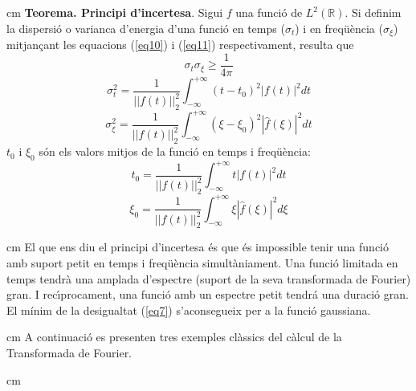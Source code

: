 \documentclass{article}
\def\R{\mathbb R}
\begin{document}
 cm
\noindent
\textbf{Teorema. Principi d'incertesa}.
Sigui $f$ una funci\'o de $L^2(\R)$.
Si definim la dispersi\'o o varian{c}a d'energia d'una funci\'o en temps 
($\sigma_t$) i en freq\"u\`encia ($\sigma_\xi$) mitjan\c{c}ant les equacions 
(\ref{eq10}) 
i (\ref{eq11}) respectivament, resulta que
\begin{equation}
\label{eq9}
\sigma_t \sigma_\xi \geq \frac{1}{4 \pi}
\end{equation}
\begin{equation}
\label{eq10}
\sigma^2_t=\frac{1}{||f(t)||^2_2}\int_{-\infty}^{+\infty} (t-t_0)^2 |f(t)|^2 dt
\end{equation}
\begin{equation}
\label{eq11}
\sigma^2_\xi=\frac{1}{||f(t)||^2_2}\int_{-\infty}^{+\infty} (\xi-\xi_0)^2 |\hat{f}(\xi)|^2 dt
\end{equation}
\noindent
$t_0$ i $\xi_0$ s\'on els valors mitjos de la funci\'o en temps i freq\"u\`encia:
\[
t_0=\frac{1}{||f(t)||^2_2}\int_{-\infty}^{+\infty} t |f(t)|^2 dt
\]
\[
\xi_0=\frac{1}{||f(t)||^2_2}\int_{-\infty}^{+\infty} \xi |\hat{f}(\xi)|^2 d\xi
\]

 cm
El que ens diu el principi d'incertesa \'es que \'es impossible tenir  
una funci\'o amb suport petit en temps i freq\"u\`encia simult\`aniament. 
Una funci\'o limitada en temps tendr\`a una amplada d'espectre (suport de la
seva transformada de Fourier) gran. I rec\'\i procament, una funci\'o amb un 
espectre petit tendr\'a una duraci\'o gran. El m\'inim de la desigualtat (\ref{eq7})
s'aconsegueix per a la funci\'o gaussiana.

 cm
A continuaci\'o es presenten tres exemples cl\`assics del c\`alcul de la Transformada
de Fourier.

 cm
\end{document}
